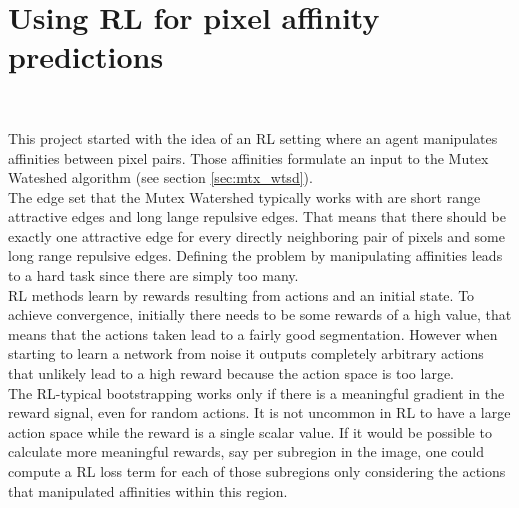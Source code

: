 \section{Using RL for pixel affinity predictions}~\label{sec:rl_for_seg}

This project started with the idea of an RL setting where an agent manipulates affinities between pixel pairs. Those affinities formulate an input to the Mutex Wateshed algorithm (see section \ref{sec:mtx_wtsd}).\\
The edge set that the Mutex Watershed typically works with are short range attractive edges and long lange repulsive edges. That means that there should be exactly one attractive edge for every directly neighboring pair of pixels and some long range repulsive edges. Defining the problem by manipulating affinities leads to a hard task since there are simply too many.\\
RL methods learn by rewards resulting from actions and an initial state. To achieve convergence, initially there needs to be some rewards of a high value, that means that the actions taken lead to a fairly good segmentation. However when starting to learn a network from noise it outputs completely arbitrary actions that unlikely lead to a high reward because the action space is too large.\\
The RL-typical bootstrapping works only if there is a meaningful gradient in the reward signal, even for random actions. It is not uncommon in RL to have a large action space while the reward is a single scalar value. If it would be possible to calculate more meaningful rewards, say per subregion in the image, one could compute a RL loss term for each of those subregions only considering the actions that manipulated affinities within this region.\\

